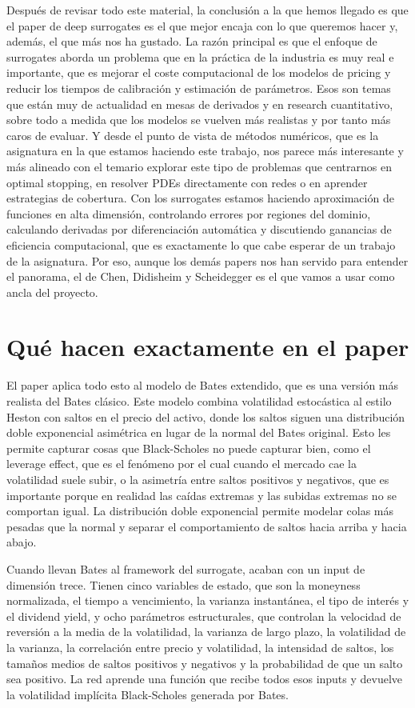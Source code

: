 \documentclass[11pt,a4paper]{article}
\begin{document}
Después de revisar todo este material, la conclusión a la que hemos llegado es que el paper de deep surrogates es el que mejor encaja con lo que queremos hacer y, además, el que más nos ha gustado. La razón principal es que el enfoque de surrogates aborda un problema que en la práctica de la industria es muy real e importante, que es mejorar el coste computacional de los modelos de pricing y reducir los tiempos de calibración y estimación de parámetros. Esos son temas que están muy de actualidad en mesas de derivados y en research cuantitativo, sobre todo a medida que los modelos se vuelven más realistas y por tanto más caros de evaluar. Y desde el punto de vista de métodos numéricos, que es la asignatura en la que estamos haciendo este trabajo, nos parece más interesante y más alineado con el temario explorar este tipo de problemas que centrarnos en optimal stopping, en resolver PDEs directamente con redes o en aprender estrategias de cobertura. Con los surrogates estamos haciendo aproximación de funciones en alta dimensión, controlando errores por regiones del dominio, calculando derivadas por diferenciación automática y discutiendo ganancias de eficiencia computacional, que es exactamente lo que cabe esperar de un trabajo de la asignatura. Por eso, aunque los demás papers nos han servido para entender el panorama, el de Chen, Didisheim y Scheidegger es el que vamos a usar como ancla del proyecto.

\section*{Qué hacen exactamente en el paper}

El paper aplica todo esto al modelo de Bates extendido, que es una versión más realista del Bates clásico. Este modelo combina volatilidad estocástica al estilo Heston con saltos en el precio del activo, donde los saltos siguen una distribución doble exponencial asimétrica en lugar de la normal del Bates original. Esto les permite capturar cosas que Black-Scholes no puede capturar bien, como el leverage effect, que es el fenómeno por el cual cuando el mercado cae la volatilidad suele subir, o la asimetría entre saltos positivos y negativos, que es importante porque en realidad las caídas extremas y las subidas extremas no se comportan igual. La distribución doble exponencial permite modelar colas más pesadas que la normal y separar el comportamiento de saltos hacia arriba y hacia abajo.

Cuando llevan Bates al framework del surrogate, acaban con un input de dimensión trece. Tienen cinco variables de estado, que son la moneyness normalizada, el tiempo a vencimiento, la varianza instantánea, el tipo de interés y el dividend yield, y ocho parámetros estructurales, que controlan la velocidad de reversión a la media de la volatilidad, la varianza de largo plazo, la volatilidad de la varianza, la correlación entre precio y volatilidad, la intensidad de saltos, los tamaños medios de saltos positivos y negativos y la probabilidad de que un salto sea positivo. La red aprende una función que recibe todos esos inputs y devuelve la volatilidad implícita Black-Scholes generada por Bates.
\end{document}
